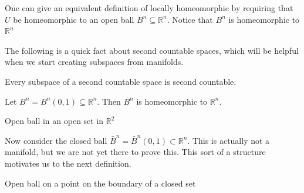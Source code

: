 \documentclass[notoc,notitlepage]{tufte-book}
\begin{document}
\begin{note}
  One can give an equivalent definition of locally homeomorphic by requiring that
  $U$ be homeomorphic to an open ball $B^n \subseteq \mathbb{R}^n$. Notice that
  $B^n$ is homeomorphic to $\mathbb{R}^n$ 
\end{note}

The following is a quick fact about second countable spaces, which will be helpful
when we start creating subspaces from manifolds.

\begin{propo}\label{propo:subspaces_of_second_countable_spaces_are_second_countable}
  Every subspace of a second countable space is second countable.
\end{propo}

\begin{eg}
  Let $B^n = B^n(0, 1) \subseteq \mathbb{R}^n$. Then $B^n$ is homeomorphic to
  $\mathbb{R}^n$.
  \begin{marginfigure}
    \centering
    \caption{Open ball in an open set in $\mathbb{R}^2$}\label{fig:open_ball_in_an_open_set_in_r_2_}
  \end{marginfigure}
\end{eg}

\begin{eg}
  Now consider the closed ball $\bar{B}^n = \bar{B}^n(0, 1) \subset \mathbb{R}^n$. This is
  actually not a manifold, but we are not yet there to prove this. This sort of a structure
  motivates us to the next definition.
  \begin{marginfigure}
    \centering
    \caption{Open ball on a point on the boundary of a closed set}\label{fig:open_ball_on_a_point_on_the_boundary_of_a_closed_set}
  \end{marginfigure}
\end{eg}
\end{document}
